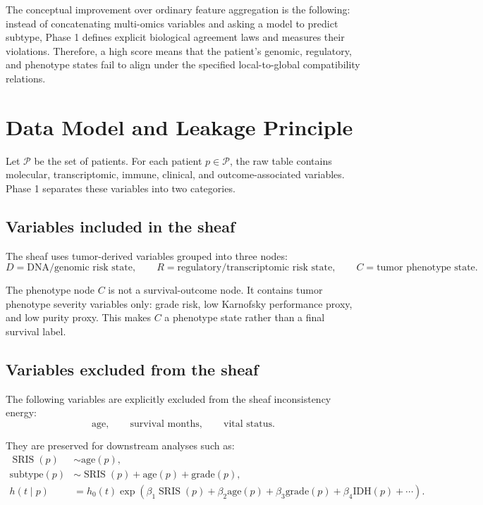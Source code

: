 \documentclass[11pt]{article}
\newcommand{\SRIS}{\operatorname{SRIS}}
\begin{document}
The conceptual improvement over ordinary feature aggregation is the following: instead of concatenating multi-omics variables and asking a model to predict subtype, Phase 1 defines explicit biological agreement laws and measures their violations.  Therefore, a high score means that the patient's genomic, regulatory, and phenotype states fail to align under the specified local-to-global compatibility relations.

\section{Data Model and Leakage Principle}

Let $\mathcal{P}$ be the set of patients.  For each patient $p\in\mathcal{P}$, the raw table contains molecular, transcriptomic, immune, clinical, and outcome-associated variables.  Phase 1 separates these variables into two categories.

\subsection{Variables included in the sheaf}

The sheaf uses tumor-derived variables grouped into three nodes:
\[
D=\text{DNA/genomic risk state},\qquad
R=\text{regulatory/transcriptomic risk state},\qquad
C=\text{tumor phenotype state}.
\]

The phenotype node $C$ is not a survival-outcome node.  It contains tumor phenotype severity variables only: grade risk, low Karnofsky performance proxy, and low purity proxy.  This makes $C$ a phenotype state rather than a final survival label.

\subsection{Variables excluded from the sheaf}

The following variables are explicitly excluded from the sheaf inconsistency energy:
\[
\text{age},\qquad \text{survival months},\qquad \text{vital status}.
\]

They are preserved for downstream analyses such as:
\begin{align*}
\SRIS(p) &\sim \text{age}(p),\\
\text{subtype}(p) &\sim \SRIS(p)+\text{age}(p)+\text{grade}(p),\\
h(t\mid p) &=h_0(t)\exp\left(\beta_1\SRIS(p)+\beta_2\text{age}(p)+\beta_3\text{grade}(p)+\beta_4\text{IDH}(p)+\cdots\right).
\end{align*}
\end{document}
